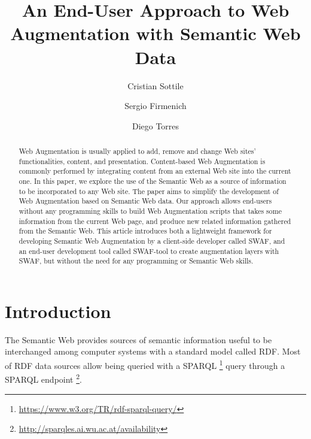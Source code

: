 \documentclass[runningheads]{llncs}
\begin{document}
%
\title{An End-User Approach to Web Augmentation with Semantic Web Data}
%
%
\author{Cristian Sottile \and
Sergio Firmenich \and
Diego Torres}
%
%
%
\maketitle              %
%
\begin{abstract}
    Web Augmentation is usually applied to add, remove and change Web sites' functionalities, content, and presentation. Content-based Web Augmentation is commonly performed by integrating content from an external Web site into the current one. In this paper, we explore the use of the Semantic Web as a source of information to be incorporated to any Web site. The paper aims to simplify the development of Web Augmentation based on Semantic Web data. Our approach allows end-users without any programming skills to build Web Augmentation scripts that takes some information from the current Web page, and produce new related information gathered from the Semantic Web. This article introduces both a lightweight framework for developing Semantic Web Augmentation by a client-side developer called SWAF, and an end-user development tool called SWAF-tool to create augmentation layers with SWAF, but without the need for any programming or Semantic Web skills.

\end{abstract}
%
%
%

\section{Introduction}
\label{sec-introduction}


The Semantic Web\cite{Berners-Lee2001TheWeb,Shadbolt2006TheRevisited} provides sources of semantic information useful to be interchanged among computer systems with a standard model called RDF. Most of RDF data sources allow being queried with a SPARQL \footnote{\url{https://www.w3.org/TR/rdf-sparql-query/}} query through a SPARQL endpoint \footnote{\url{http://sparqles.ai.wu.ac.at/availability}}.
\end{document}
